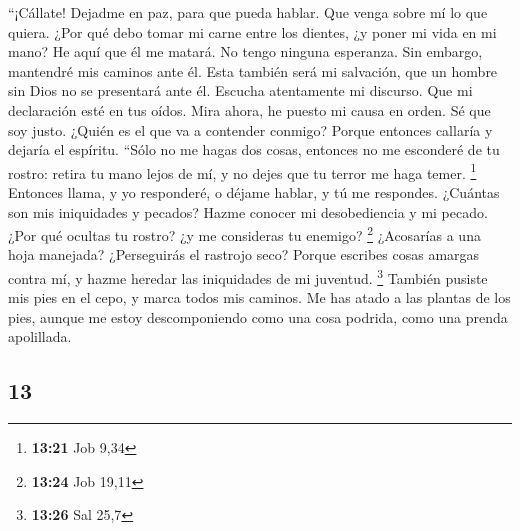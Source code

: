 \begin{paracol}{2}
 ``¡Cállate! Dejadme en paz, para que pueda hablar. Que
venga sobre mí lo que quiera.  ¿Por qué debo tomar mi
carne entre los dientes, ¿y poner mi vida en mi mano?  He
aquí que él me matará. No tengo ninguna esperanza. Sin embargo,
mantendré mis caminos ante él.  Esta también será mi
salvación, que un hombre sin Dios no se presentará ante él.
 Escucha atentamente mi discurso. Que mi declaración esté
en tus oídos.  Mira ahora, he puesto mi causa en orden.
Sé que soy justo.  ¿Quién es el que va a contender
conmigo? Porque entonces callaría y dejaría el espíritu. 
``Sólo no me hagas dos cosas, entonces no me esconderé de tu rostro:
 retira tu mano lejos de mí, y no dejes que tu terror me
haga temer. \footnote{\textbf{13:21} Job 9,34}  Entonces
llama, y yo responderé, o déjame hablar, y tú me respondes.
 ¿Cuántas son mis iniquidades y pecados? Hazme conocer mi
desobediencia y mi pecado.  ¿Por qué ocultas tu rostro?
¿y me consideras tu enemigo? \footnote{\textbf{13:24} Job 19,11}
 ¿Acosarías a una hoja manejada? ¿Perseguirás el rastrojo
seco?  Porque escribes cosas amargas contra mí, y hazme
heredar las iniquidades de mi juventud. \footnote{\textbf{13:26} Sal
  25,7}  También pusiste mis pies en el cepo, y marca
todos mis caminos. Me has atado a las plantas de los pies,
 aunque me estoy descomponiendo como una cosa podrida,
como una prenda apolillada.

\switchcolumn
\begin{otherlanguage}{english}

\hypertarget{section-25}{%
\section{13}\label{section-25}}


\end{otherlanguage}
\end{paracol}
